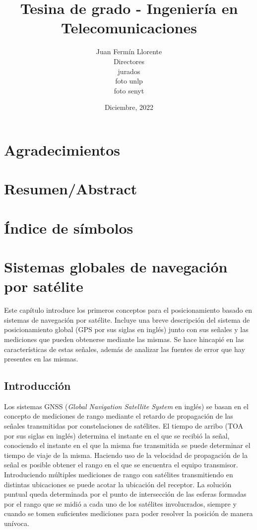 \documentclass[a4paper,12pt,oneside,onecolumn,final,openright]{book}%
\title{Tesina de grado - Ingeniería en Telecomunicaciones}
\author{Juan Fermín Llorente\\Directores\\jurados\\foto unlp\\foto senyt}
\date{Diciembre, 2022}
\begin{document}
\maketitle

\chapter*{Agradecimientos}
\newpage
\chapter*{Resumen/Abstract}
\newpage
{}
\chapter*{Índice de símbolos}
\newpage
{}
\tableofcontents
\newpage
{}
\listoffigures


\chapter{Sistemas globales de navegación por satélite}
	Este capítulo introduce los primeros conceptos para el posicionamiento basado en sistemas de navegación por satélite. Incluye una breve descripción del sistema de posicionamiento global (GPS por sus siglas en inglés) junto con sus señales y las mediciones que pueden obtenerse mediante las mismas. Se hace hincapié en las características de estas señales, además de analizar las fuentes de error que hay presentes en las mismas.
	
\section{Introducción}
	Los sistemas GNSS (\textit{Global Navigation Satellite System} en inglés) se basan en el concepto de mediciones de rango mediante el retardo de propagación de las señales transmitidas por constelaciones de satélites. El tiempo de arribo (TOA por sus siglas en inglés) determina el instante en el que se recibió la señal, conociendo el instante en el que la misma fue transmitida se puede determinar el tiempo de viaje de la misma. Haciendo uso de la velocidad de propagación de la señal es posible obtener el rango en el que se encuentra el equipo transmisor. Introduciendo múltiples mediciones de rango con satélites transmitiendo en distintas ubicaciones se puede acotar la ubicación del receptor. La solución puntual queda determinada por el punto de intersección de las esferas formadas por el rango que se midió a cada uno de los satélites involucrados, siempre y cuando se tomen suficientes mediciones para poder resolver la posición de manera unívoca. 
	
\end{document}
